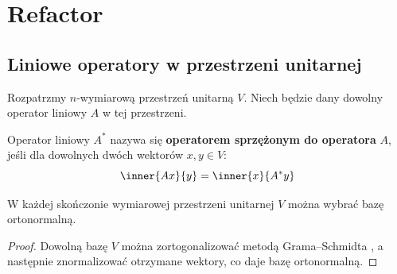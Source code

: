 \chapter{Refactor}

\section{Liniowe operatory w przestrzeni unitarnej}

Rozpatrzmy $n$-wymiarową przestrzeń unitarną $V$. Niech będzie dany dowolny operator liniowy $A$ w tej przestrzeni.

\begin{definition}
    Operator liniowy $A^*$ nazywa się \textbf{operatorem sprzężonym do operatora} $A$, jeśli dla dowolnych dwóch wektorów $x, y \in V$:
    \begin{equation}\label{eq:def_conjugated_operator}
        \inner{Ax}{y} = \inner{x}{A^*y}
    \end{equation}
\end{definition}
\begin{lemma}\label{lemma:existing_of_ortonormal_base}
W każdej skończonie wymiarowej przestrzeni unitarnej $V$ można wybrać bazę ortonormalną.
\end{lemma}   
\begin{proof}
    Dowolną bazę $V$ można zortogonalizować metodą Grama–Schmidta \cite[s. 140--142]{mostowski1977}, a następnie znormalizować otrzymane wektory, co daje bazę ortonormalną.
\end{proof}



